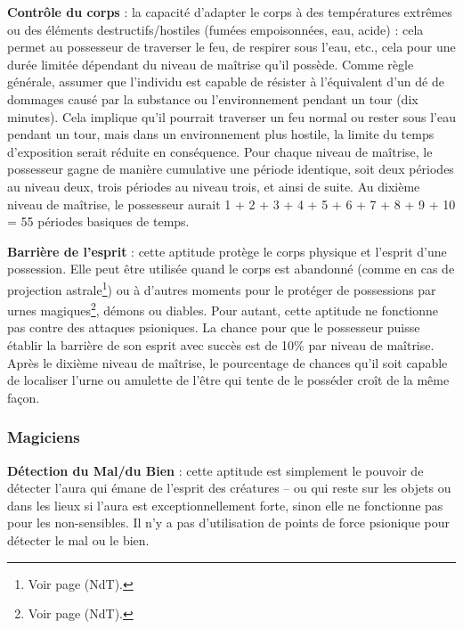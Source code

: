 {\textbf{Contrôle du corps} : la capacité d'adapter le corps à des températures extrêmes ou des éléments destructifs/hostiles (fumées empoisonnées, eau, acide) : cela permet au possesseur de traverser le feu, de respirer sous l'eau, etc., cela pour une durée limitée dépendant du niveau de maîtrise qu'il possède. Comme règle générale, assumer que l'individu est capable de résister à l'équivalent d'un dé de dommages causé par la substance ou l'environnement pendant un tour (dix minutes). Cela implique qu'il pourrait traverser un feu normal ou rester sous l'eau pendant un tour, mais dans un environnement plus hostile, la limite du temps d'exposition serait réduite en conséquence. Pour chaque niveau de maîtrise, le possesseur gagne de manière cumulative une période identique, soit deux périodes au niveau deux, trois périodes au niveau trois, et ainsi de suite. Au dixième niveau de maîtrise, le possesseur aurait 1 + 2 + 3 + 4 + 5 + 6 + 7 + 8 + 9 + 10 = 55 périodes basiques de temps.

\bigskip

\textbf{Barrière de l'esprit} : cette aptitude protège le corps physique et l'esprit d'une possession. Elle peut être utilisée quand le corps est abandonné (comme en cas de projection astrale\footnote{Voir page \pageref{sort-astral} (NdT).}) ou à d'autres moments pour le protéger de possessions par urnes magiques\footnote{Voir page \pageref{sort-urne-magique} (NdT).}, démons ou diables. Pour autant, cette aptitude ne fonctionne pas contre des attaques psioniques. La chance pour que le possesseur puisse établir la barrière de son esprit avec succès est de 10\% par niveau de maîtrise. Après le dixième niveau de maîtrise, le pourcentage de chances qu'il soit capable de localiser l'urne ou amulette de l'être qui tente de le posséder croît de la même façon.

\subsubsection*{Magiciens}

\textbf{Détection du Mal/du Bien} : cette aptitude est simplement le pouvoir de détecter l'aura qui émane de l'esprit des créatures -- ou qui reste sur les objets ou dans les lieux si l'aura est exceptionnellement forte, sinon elle ne fonctionne pas pour les non-sensibles. Il n'y a pas d'utilisation de points de force psionique pour détecter le mal ou le bien.

}
